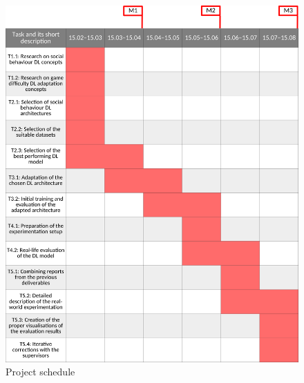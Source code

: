\documentclass[thesis]{mas_proposal}
\begin{document}
\begin{figure}[h!]
	\includegraphics[width=\textwidth]{images/plan/plan.png}
	\caption{Project schedule}
	\label{fig:gantt}
\end{figure}

\end{document}
